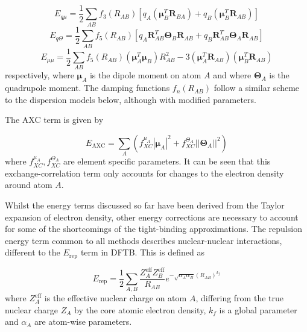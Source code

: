 \begin{equation}
    E_{q\mu} = \frac{1}{2} \sum_{AB} f_3\left(R_{AB}\right) \left[ q_A \left(\mathbf{\mu}_B^T \mathbf{R}_{BA}\right) + q_B \left(\mathbf{\mu}_B^T \mathbf{R}_{AB}\right)\right]
\end{equation}
%
\begin{equation}
    E_{q \Theta} = \frac{1}{2} \sum_{AB} f_5\left(R_{AB}\right) \left[ q_A \mathbf{R}^T_{AB} \mathbf{\Theta}_B \mathbf{R}_{AB} + q_B \mathbf{R}^T_{AB} \mathbf{\Theta}_A \mathbf{R}_{AB} \right]
\end{equation}
%
\begin{equation}
    E_{\mu\mu} = \frac{1}{2} \sum_{AB} f_5\left(R_{AB}\right) \left( \mathbf{\mu}_A^T \mathbf{\mu}_B \right) R_{AB}^2 - 3 \left( \mathbf{\mu}_A^T \mathbf{R}_{AB} \right) \left( \mathbf{\mu}_B^T \mathbf{R}_{AB} \right) 
\end{equation}
%
respectively, where  $\mathbf{\mu}_A$ is the dipole moment on atom $A$ and where 
$\mathbf{\Theta}_A$ is the quadrupole moment. The damping functions $f_n \left(R_{AB}\right)$
follow a similar scheme to the dispersion models below, although with modified parameters.

The AXC term is given by 

\begin{equation}
    E_{\text{AXC}} = \sum_A \left( f_{XC}^{\mu_A} \left\lvert \mathbf{\mu}_A\right\rvert^2  + f_{XC}^{\Theta_A} \left\lvert \left\lvert \mathbf{\Theta}_A \right\rvert\right\rvert^2\right)
\end{equation}
%
where $f_{XC}^{\mu_A}, f_{XC}^{\Theta_A}$ are element specific parameters. It can
be seen that this exchange-correlation term only accounts for changes to the electron
density around atom $A$.

Whilst the energy terms discussed so far have been derived from the Taylor expansion
of electron density, other energy corrections are necessary to account for some 
of the shortcomings of the tight-binding approximations. The repulsion energy term
common to all methods describes nuclear-nuclear interactions,
different to the $E_{\text{rep}}$ term in DFTB. This is defined as

\begin{equation}
    E_{\text{rep}} = \frac{1}{2}\sum_{A,B} \frac{Z^{\text{eff}}_A Z^{\text{eff}}_B}{R_{AB}} e^{-\sqrt{\alpha_A \alpha_B} \left(R_{AB}\right)^{k_f}}
\end{equation}
%
where $Z^{\text{eff}}_A$ is the effective nuclear charge on atom $A$, differing 
from the true nuclear charge $Z_A$ by the core atomic electron density, $k_f$ is
a global parameter and $\alpha_A$ are atom-wise parameters.

